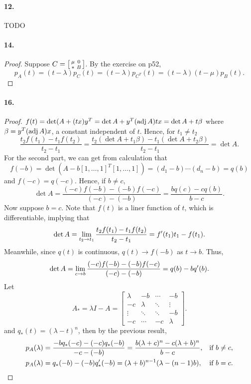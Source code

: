   \paragraph{12.} TODO
    
  \paragraph{14.}
  \begin{proof}
    Suppose $C=\begin{bsmallmatrix} \mu & 0 \\ * & B \end{bsmallmatrix}$. By the
    exercise on p52,
    \[
      p_A(t) = (t-\lambda)p_C(t) = (t-\lambda)p_{C^T}(t) 
      = (t-\lambda)(t-\mu)p_B(t).
    \]
  \end{proof}

  \paragraph{16.}
  \begin{proof}
    $f(t)=\det(A+(tx)y^T = \det A + y^T(\operatorname{adj} A)tx = \det A + t\beta$ where 
    $\beta = y^T(\operatorname{adj} A)x$, a constant independent of $t$. Hence, for $t_1\ne
    t_2$
    \[
      \frac{t_2f(t_1)-t_1f(t_2)}{t_2-t_1} 
      = \frac{t_2(\det A + t_1\beta) - t_1(\det A + t_2\beta)}{t_2-t_1}
      = \det A.
    \]
    For the second part, we can get from calculation that
    \[
      f(-b)=\det(A-b[1,\dots,1]^T[1,\dots,1]) = (d_1-b)\cdots(d_n-b)=q(b)
    \]
    and $f(-c)=q(-c)$. Hence, if $b\ne c$,
    \[
      \det A = \frac{(-c)f(-b)- (-b)f(-c)}{(-c)-(-b)}=\frac{bq(c)-cq(b)}{b-c}.
    \]
    Now suppose $b=c$. Note that $f(t)$ is a liner function of $t$, which is 
    differentiable, implying that 
    \[
      \det A = \lim_{t_2\to t_1}\frac{t_2f(t_1)-t_1f(t_2)}{t_2-t_1} 
      = f^\prime(t_1)t_1 - f(t_1).
    \]
    Meanwhile, since $q(t)$ is continuous, $q(t)\to f(-b)$ as $t\to b$. Thus,
    \[
      \det A = \lim_{c\to b}\frac{(-c)f(-b)- (-b)f(-c)}{(-c)-(-b)}
      = q(b) - bq^\prime(b).
    \]
    Let 
    \[
      A_* = \lambda I - A = 
      \begin{bmatrix}
        \lambda & -b      & \cdots & -b \\
        -c      & \lambda & \ddots & \vdots \\
        \vdots  & \ddots  & \ddots & -b \\
        -c      & \cdots  & -c     & \lambda 
      \end{bmatrix}.
    \]
    and $q_*(t)=(\lambda - t)^n$, then by the previous result,
    \begin{align*}
      p_A(\lambda) &= \frac{-bq_*(-c) - (-c)q_*(-b)}{-c-(-b)} 
                    = \frac{b(\lambda+c)^n - c(\lambda+b)^n}{b-c}, 
                      & \text{if } b\ne c, \\ 
      p_A(\lambda) &= q_*(-b)-(-b)q_*^\prime(-b) 
                    = (\lambda+b)^{n-1}(\lambda-(n-1)b),
                      & \text{if } b=c. 
    \end{align*}
  \end{proof}

